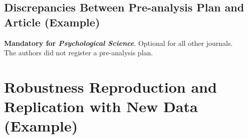 \documentclass[12pt,a4paper]{article}
\begin{document}
\subsection{Discrepancies Between Pre-analysis Plan and Article (Example)}
\textbf{Mandatory for \textit{Psychological Science}}. Optional for all other journals.
\\[0.25cm]
The authors did not register a pre-analysis plan.


%
%
%
%
%

\section{Robustness Reproduction and Replication with New Data (Example)}
\end{document}
